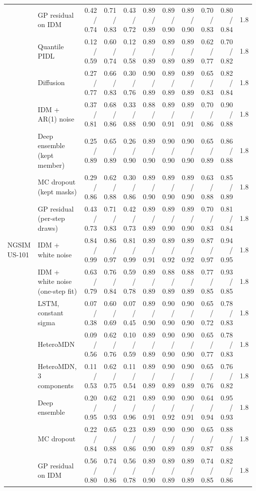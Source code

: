 \begin{longtable}{llrrrrrrrrr}
 & GP residual on IDM & 0.42 / 0.74 & 0.71 / 0.83 & 0.43 / 0.72 & 0.89 / 0.89 & 0.89 / 0.90 & 0.89 / 0.90 & 0.70 / 0.83 & 0.80 / 0.84 & 1.8 \\
 & Quantile PIDL & 0.12 / 0.59 & 0.60 / 0.74 & 0.12 / 0.58 & 0.89 / 0.89 & 0.89 / 0.89 & 0.89 / 0.89 & 0.62 / 0.77 & 0.70 / 0.82 & 1.8 \\
 & Diffusion & 0.27 / 0.77 & 0.66 / 0.83 & 0.30 / 0.76 & 0.90 / 0.89 & 0.89 / 0.89 & 0.89 / 0.89 & 0.65 / 0.83 & 0.82 / 0.84 & 1.8 \\
 & IDM + AR(1) noise & 0.37 / 0.81 & 0.68 / 0.86 & 0.33 / 0.88 & 0.88 / 0.90 & 0.89 / 0.91 & 0.89 / 0.91 & 0.70 / 0.86 & 0.90 / 0.88 & 1.8 \\
 & Deep ensemble (kept member) & 0.25 / 0.89 & 0.65 / 0.89 & 0.26 / 0.90 & 0.89 / 0.90 & 0.90 / 0.90 & 0.90 / 0.90 & 0.65 / 0.89 & 0.86 / 0.88 & 1.8 \\
 & MC dropout (kept masks) & 0.29 / 0.86 & 0.62 / 0.88 & 0.30 / 0.86 & 0.89 / 0.90 & 0.89 / 0.90 & 0.89 / 0.90 & 0.63 / 0.88 & 0.85 / 0.89 & 1.8 \\
 & GP residual (per-step draws) & 0.43 / 0.73 & 0.71 / 0.83 & 0.42 / 0.73 & 0.89 / 0.89 & 0.89 / 0.90 & 0.89 / 0.90 & 0.70 / 0.83 & 0.81 / 0.84 & 1.8 \\
\midrule
NGSIM US-101 & IDM + white noise & 0.84 / 0.99 & 0.86 / 0.97 & 0.81 / 0.99 & 0.89 / 0.91 & 0.89 / 0.92 & 0.89 / 0.92 & 0.87 / 0.97 & 0.94 / 0.95 & 1.8 \\
 & IDM + white noise (one-step fit) & 0.63 / 0.79 & 0.76 / 0.84 & 0.59 / 0.78 & 0.89 / 0.89 & 0.88 / 0.89 & 0.88 / 0.89 & 0.77 / 0.85 & 0.93 / 0.85 & 1.8 \\
 & LSTM, constant sigma & 0.07 / 0.38 & 0.60 / 0.69 & 0.07 / 0.45 & 0.89 / 0.90 & 0.90 / 0.90 & 0.90 / 0.90 & 0.65 / 0.72 & 0.78 / 0.83 & 1.8 \\
 & HeteroMDN & 0.09 / 0.56 & 0.62 / 0.76 & 0.10 / 0.59 & 0.89 / 0.89 & 0.90 / 0.90 & 0.90 / 0.90 & 0.65 / 0.77 & 0.78 / 0.83 & 1.8 \\
 & HeteroMDN, 3 components & 0.11 / 0.53 & 0.62 / 0.75 & 0.11 / 0.54 & 0.89 / 0.89 & 0.90 / 0.89 & 0.90 / 0.89 & 0.65 / 0.76 & 0.76 / 0.82 & 1.8 \\
 & Deep ensemble & 0.20 / 0.95 & 0.62 / 0.93 & 0.21 / 0.96 & 0.89 / 0.91 & 0.90 / 0.92 & 0.90 / 0.91 & 0.64 / 0.94 & 0.95 / 0.93 & 1.8 \\
 & MC dropout & 0.22 / 0.84 & 0.65 / 0.88 & 0.23 / 0.86 & 0.89 / 0.90 & 0.90 / 0.89 & 0.90 / 0.89 & 0.65 / 0.87 & 0.88 / 0.88 & 1.8 \\
 & GP residual on IDM & 0.56 / 0.80 & 0.74 / 0.86 & 0.56 / 0.78 & 0.89 / 0.90 & 0.89 / 0.89 & 0.89 / 0.89 & 0.74 / 0.85 & 0.82 / 0.86 & 1.8 \\

\end{longtable}
